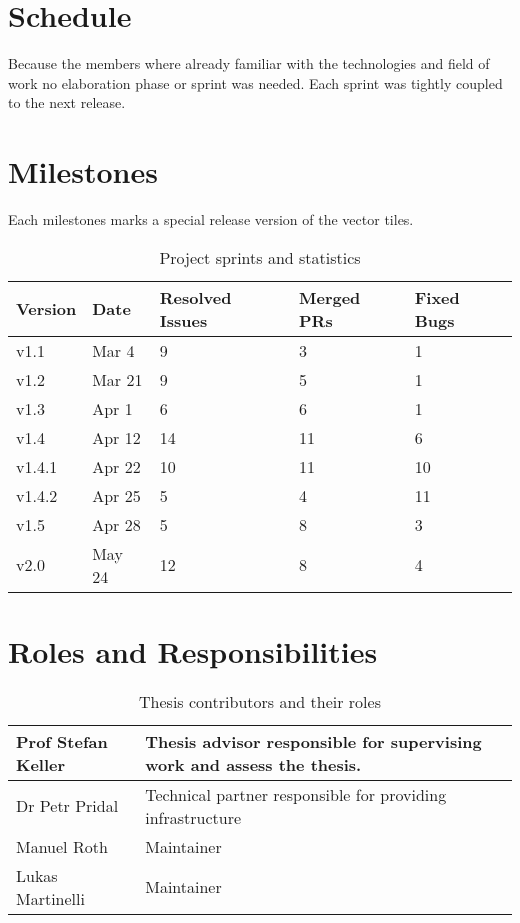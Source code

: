 \section{Schedule}

Because the \osmvt{} members where already familiar with the technologies and field of work no elaboration phase or sprint was needed. Each sprint was tightly coupled to the next release.

\section{Milestones}

Each milestones marks a special release version of the vector tiles.

\begin{table}[H]
\centering
    \begin{tabular}{p{1.5cm} p{1.5cm} p{1.5cm} p{1.5cm} p{1.5cm}}
    Version & Date  & Resolved Issues & Merged PRs & Fixed Bugs\\
    \hline
    v1.1   & Mar 4  & 9 & 3 & 1 \\
    v1.2   & Mar 21 & 9 & 5 & 1 \\
    v1.3   & Apr 1  & 6 & 6 & 1 \\
    v1.4   & Apr 12 & 14 & 11 & 6 \\
    v1.4.1 & Apr 22 & 10 & 11 & 10 \\
    v1.4.2 & Apr 25 & 5 & 4 & 11 \\
    v1.5   & Apr 28 & 5 & 8 & 3 \\
    v2.0   & May 24 & 12 & 8 & 4 \\
    \end{tabular}
    \caption[Milestones]{Project sprints and statistics}
\end{table}

\section{Roles and Responsibilities}\label{roles-and-responsibilities}

\begin{table}[H]
\centering
    \begin{tabular}{p{3cm} p{9.5cm}}
Prof Stefan Keller & Thesis advisor responsible for supervising work and
assess the thesis.\\ \hline
Dr Petr Pridal &
Technical partner responsible for providing infrastructure \\ \hline
Manuel Roth &
Maintainer\\ \hline
Lukas Martinelli &
Maintainer\\ \hline
    \end{tabular}
    \caption{Thesis contributors and their roles}
\end{table}

